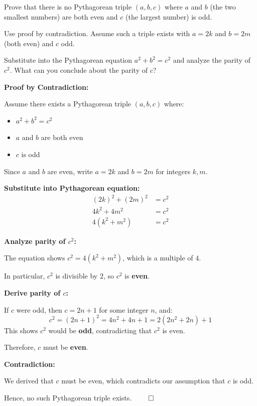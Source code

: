 
\begin{problem}
Prove that there is no Pythagorean triple $(a, b, c)$ where $a$ and $b$ (the two smallest numbers) are both even and $c$ (the largest number) is odd.
\end{problem}

\begin{hint}
Use proof by contradiction. Assume such a triple exists with $a = 2k$ and $b = 2m$ (both even) and $c$ odd.

Substitute into the Pythagorean equation $a^2 + b^2 = c^2$ and analyze the parity of $c^2$. What can you conclude about the parity of $c$?
\end{hint}

\begin{solution}
\textbf{Proof by Contradiction:}

Assume there exists a Pythagorean triple $(a, b, c)$ where:
\begin{itemize}
\item $a^2 + b^2 = c^2$
\item $a$ and $b$ are both even
\item $c$ is odd
\end{itemize}

Since $a$ and $b$ are even, write $a = 2k$ and $b = 2m$ for integers $k, m$.

\vspace{0.3cm}

\textbf{Substitute into Pythagorean equation:}
\begin{align*}
(2k)^2 + (2m)^2 &= c^2 \\
4k^2 + 4m^2 &= c^2 \\
4(k^2 + m^2) &= c^2
\end{align*}

\vspace{0.3cm}

\textbf{Analyze parity of $c^2$:}

The equation shows $c^2 = 4(k^2 + m^2)$, which is a multiple of $4$.

In particular, $c^2$ is divisible by $2$, so $c^2$ is \textbf{even}.

\vspace{0.3cm}

\textbf{Derive parity of $c$:}

If $c$ were odd, then $c = 2n+1$ for some integer $n$, and:
\[
c^2 = (2n+1)^2 = 4n^2 + 4n + 1 = 2(2n^2 + 2n) + 1
\]
This shows $c^2$ would be \textbf{odd}, contradicting that $c^2$ is even.

Therefore, $c$ must be \textbf{even}.

\vspace{0.3cm}

\textbf{Contradiction:}

We derived that $c$ must be even, which contradicts our assumption that $c$ is odd.

Hence, no such Pythagorean triple exists. $\qed$
\end{solution}

